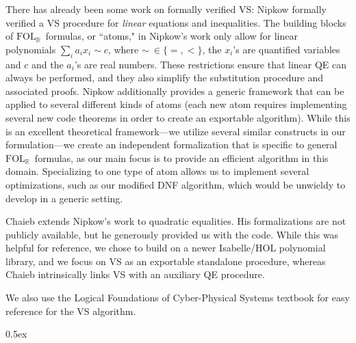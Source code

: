 \documentclass[11pt,a4paper]{article}
\newcommand{\FOLR}{$\text{FOL}_{\mathbb{R}}$}
\begin{document}
There has already been some work on formally verified VS: Nipkow \cite{nipkow2010linear} formally verified a VS procedure for \emph{linear} equations and inequalities.
The building blocks of \FOLR~formulas, or ``atoms," in Nipkow's work only allow for linear polynomials $\sum_i a_i x_i\sim c$, where $\sim\ \in \{=,<\}$, the $x_i$'s are quantified variables and $c$ and the $a_i$'s are real numbers.
These restrictions ensure that linear QE can always be performed, and they also simplify the substitution procedure and associated proofs.
Nipkow additionally provides a generic framework that can be applied to several different kinds of atoms (each new atom requires implementing several new code theorems in order to create an exportable algorithm).
While this is an excellent theoretical framework---we utilize several similar constructs in our formulation---we create an independent formalization that is specific to general \FOLR~formulas, as our main focus is to provide an efficient algorithm in this domain.
Specializing to one type of atom allows us to implement several optimizations, such as our modified DNF algorithm, which would be unwieldy to develop in a generic setting.

Chaieb \cite{chaieb2008automated} extends Nipkow's work to quadratic equalities.
His formalizations are not publicly available, but he generously provided us with the code.
While this was helpful for reference, we chose to build on a newer Isabelle/HOL polynomial library, and we focus on VS as an exportable standalone procedure, whereas Chaieb intrinsically links VS with an auxiliary QE procedure.

We also use the Logical Foundations of Cyber-Physical Systems textbook\cite{Platzer18} for easy reference for the VS algorithm.

\parindent 0pt\parskip 0.5ex





\end{document}
